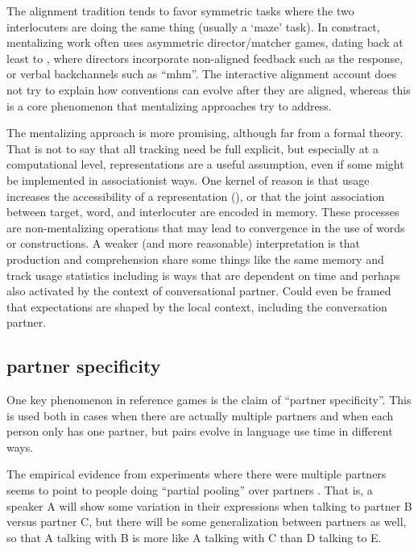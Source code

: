 \documentclass[]{article}
\begin{document}
The alignment tradition tends to favor symmetric tasks where the two interlocuters are doing the same thing (usually a `maze' task). In constract, mentalizing work often uses asymmetric director/matcher games, dating back at least to \cite{krauss1966}, where directors incorporate non-aligned feedback such as the response, or verbal backchannels such as ``mhm''. The interactive alignment account does not try to explain how conventions can evolve after they are aligned, whereas this is a core phenomenon that mentalizing approaches try to address. 

The mentalizing approach is more promising, although far from a formal theory. That is not to say that all tracking need be full explicit, but especially at a computational level, representations are a useful assumption, even if some might be implemented in associationist ways.  One kernel of reason is that usage increases the accessibility of a representation (\cite{macdonald1994}), or that the joint association between target, word, and interlocuter are encoded in memory. These processes are non-mentalizing operations that may lead to convergence in the use of words or constructions. A weaker (and more reasonable) interpretation is that production and comprehension share some things like the same memory and track usage statistics including is ways that are dependent on time and perhaps also activated by the context of conversational partner.  Could even be framed that expectations are shaped by the local context, including the conversation partner. 

\subsection{partner specificity}


One key phenomenon in reference games is the claim of ``partner specificity''. This is used both in cases when there are actually multiple partners and when each person only has one partner, but pairs evolve in language use time in different ways. 

The empirical evidence from experiments where there were multiple partners seems to point to people doing ``partial pooling'' over partners \cite{hawkins2021, yoon2014}. That is, a speaker A will show some variation in their expressions when talking to partner B versus partner C, but there will be some generalization between partners as well, so that A talking with B is more like A talking with C than D talking to E. 
\end{document}
